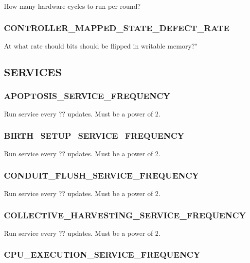 
How many hardware cycles to run per round?

\subsubsection{CONTROLLER\_MAPPED\_STATE\_DEFECT\_RATE}


At what rate should bits should be flipped in writable memory?"

\subsection{SERVICES}

\subsubsection{APOPTOSIS\_SERVICE\_FREQUENCY}


Run service every ?? updates.
Must be a power of 2.

\subsubsection{BIRTH\_SETUP\_SERVICE\_FREQUENCY}


Run service every ?? updates.
Must be a power of 2.

\subsubsection{CONDUIT\_FLUSH\_SERVICE\_FREQUENCY}


Run service every ?? updates.
Must be a power of 2.

\subsubsection{COLLECTIVE\_HARVESTING\_SERVICE\_FREQUENCY}


Run service every ?? updates.
Must be a power of 2.

\subsubsection{CPU\_EXECUTION\_SERVICE\_FREQUENCY}

